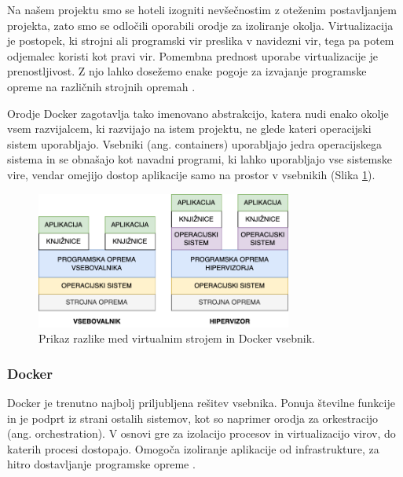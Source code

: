 \documentclass[a4paper, 12pt]{book}
\begin{document}
Na našem projektu smo se hoteli izogniti nevšečnostim z oteženim postavljanjem projekta, zato smo se odločili oporabili orodje za izoliranje okolja. Virtualizacija je postopek, ki strojni ali programski vir preslika v navidezni vir, tega pa potem odjemalec koristi kot pravi vir. Pomembna prednost uporabe virtualizacije je prenostljivost. Z njo lahko dosežemo enake pogoje za izvajanje programske opreme na različnih strojnih opremah \cite{docker-in-action}.

Orodje Docker zagotavlja tako imenovano abstrakcijo, katera nudi enako okolje vsem razvijalcem, ki razvijajo na istem projektu, ne glede kateri operacijski sistem uporabljajo. Vsebniki (ang. containers) uporabljajo jedra operacijskega sistema in se obnašajo kot navadni programi, ki lahko uporabljajo vse sistemske vire, vendar omejijo dostop aplikacije samo na prostor v vsebnikih (Slika \ref{docker-vs-vm}). \clearpage

\begin{figure}[h]
\begin{center}
\includegraphics[width=0.75\textwidth]{slike/docker-vs-vm.png}
\end{center}
\caption{ Prikaz razlike med virtualnim strojem in Docker vsebnik. }
\label{docker-vs-vm}
\end{figure}

\subsubsection{Docker}
\label{docker-section}
Docker je trenutno najbolj priljubljena rešitev vsebnika. Ponuja številne funkcije in je podprt iz strani ostalih sistemov, kot so naprimer orodja za orkestracijo (ang. orchestration). V osnovi gre za izolacijo procesov in virtualizacijo virov, do katerih procesi dostopajo. Omogoča izoliranje aplikacije od infrastrukture, za hitro dostavljanje programske opreme \cite{linuxcontainers}. 
\end{document}
